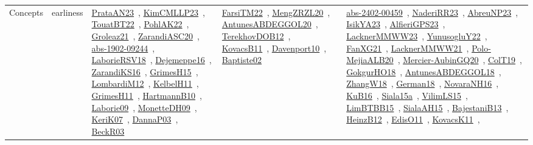 {\begin{longtable}{lp{3cm}>{\raggedright\arraybackslash}p{6cm}>{\raggedright\arraybackslash}p{6cm}>{\raggedright\arraybackslash}p{8cm}}
Concepts & earliness & \href{works/PrataAN23.pdf}{PrataAN23}~\cite{PrataAN23}, \href{works/KimCMLLP23.pdf}{KimCMLLP23}~\cite{KimCMLLP23}, \href{works/TouatBT22.pdf}{TouatBT22}~\cite{TouatBT22}, \href{works/PohlAK22.pdf}{PohlAK22}~\cite{PohlAK22}, \href{works/Groleaz21.pdf}{Groleaz21}~\cite{Groleaz21}, \href{works/ZarandiASC20.pdf}{ZarandiASC20}~\cite{ZarandiASC20}, \href{works/abs-1902-09244.pdf}{abs-1902-09244}~\cite{abs-1902-09244}, \href{works/LaborieRSV18.pdf}{LaborieRSV18}~\cite{LaborieRSV18}, \href{works/Dejemeppe16.pdf}{Dejemeppe16}~\cite{Dejemeppe16}, \href{works/ZarandiKS16.pdf}{ZarandiKS16}~\cite{ZarandiKS16}, \href{works/GrimesH15.pdf}{GrimesH15}~\cite{GrimesH15}, \href{works/LombardiM12.pdf}{LombardiM12}~\cite{LombardiM12}, \href{works/KelbelH11.pdf}{KelbelH11}~\cite{KelbelH11}, \href{works/GrimesH11.pdf}{GrimesH11}~\cite{GrimesH11}, \href{works/HartmannB10.pdf}{HartmannB10}~\cite{HartmannB10}, \href{works/Laborie09.pdf}{Laborie09}~\cite{Laborie09}, \href{works/MonetteDH09.pdf}{MonetteDH09}~\cite{MonetteDH09}, \href{works/KeriK07.pdf}{KeriK07}~\cite{KeriK07}, \href{works/DannaP03.pdf}{DannaP03}~\cite{DannaP03}, \href{works/BeckR03.pdf}{BeckR03}~\cite{BeckR03} & \href{works/FarsiTM22.pdf}{FarsiTM22}~\cite{FarsiTM22}, \href{works/MengZRZL20.pdf}{MengZRZL20}~\cite{MengZRZL20}, \href{works/AntunesABDEGGOL20.pdf}{AntunesABDEGGOL20}~\cite{AntunesABDEGGOL20}, \href{works/TerekhovDOB12.pdf}{TerekhovDOB12}~\cite{TerekhovDOB12}, \href{works/KovacsB11.pdf}{KovacsB11}~\cite{KovacsB11}, \href{works/Davenport10.pdf}{Davenport10}~\cite{Davenport10}, \href{works/Baptiste02.pdf}{Baptiste02}~\cite{Baptiste02} & \href{works/abs-2402-00459.pdf}{abs-2402-00459}~\cite{abs-2402-00459}, \href{works/NaderiRR23.pdf}{NaderiRR23}~\cite{NaderiRR23}, \href{works/AbreuNP23.pdf}{AbreuNP23}~\cite{AbreuNP23}, \href{works/IsikYA23.pdf}{IsikYA23}~\cite{IsikYA23}, \href{works/AlfieriGPS23.pdf}{AlfieriGPS23}~\cite{AlfieriGPS23}, \href{works/LacknerMMWW23.pdf}{LacknerMMWW23}~\cite{LacknerMMWW23}, \href{works/YunusogluY22.pdf}{YunusogluY22}~\cite{YunusogluY22}, \href{works/FanXG21.pdf}{FanXG21}~\cite{FanXG21}, \href{works/LacknerMMWW21.pdf}{LacknerMMWW21}~\cite{LacknerMMWW21}, \href{works/Polo-MejiaALB20.pdf}{Polo-MejiaALB20}~\cite{Polo-MejiaALB20}, \href{works/Mercier-AubinGQ20.pdf}{Mercier-AubinGQ20}~\cite{Mercier-AubinGQ20}, \href{works/ColT19.pdf}{ColT19}~\cite{ColT19}, \href{works/GokgurHO18.pdf}{GokgurHO18}~\cite{GokgurHO18}, \href{works/AntunesABDEGGOL18.pdf}{AntunesABDEGGOL18}~\cite{AntunesABDEGGOL18}, \href{works/ZhangW18.pdf}{ZhangW18}~\cite{ZhangW18}, \href{works/German18.pdf}{German18}~\cite{German18}, \href{works/NovaraNH16.pdf}{NovaraNH16}~\cite{NovaraNH16}, \href{works/KuB16.pdf}{KuB16}~\cite{KuB16}, \href{works/Siala15a.pdf}{Siala15a}~\cite{Siala15a}, \href{works/VilimLS15.pdf}{VilimLS15}~\cite{VilimLS15}, \href{works/LimBTBB15.pdf}{LimBTBB15}~\cite{LimBTBB15}, \href{works/SialaAH15.pdf}{SialaAH15}~\cite{SialaAH15}, \href{works/BajestaniB13.pdf}{BajestaniB13}~\cite{BajestaniB13}, \href{works/HeinzB12.pdf}{HeinzB12}~\cite{HeinzB12}, \href{works/EdisO11.pdf}{EdisO11}~\cite{EdisO11}, \href{works/KovacsK11.pdf}{KovacsK11}~\cite{KovacsK11}, 
\end{longtable}}
